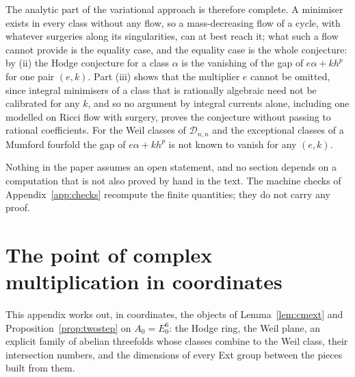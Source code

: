 \documentclass[11pt,reqno]{amsart}
\numberwithin{equation}{section}
\theoremstyle{plain}
\theoremstyle{definition}
\newcommand{\cD}{\mathcal{D}}
\begin{document}
The analytic part of the variational approach is therefore complete. A minimiser exists in every class without any flow, so a mass-decreasing flow of a cycle, with whatever surgeries along its singularities, can at best reach it; what such a flow cannot provide is the equality case, and the equality case is the whole conjecture: by (ii) the Hodge conjecture for a class $\alpha$ is the vanishing of the gap of $e\alpha+kh^{p}$ for one pair $(e,k)$. Part (iii) shows that the multiplier $e$ cannot be omitted, since integral minimisers of a class that is rationally algebraic need not be calibrated for any $k$, and so no argument by integral currents alone, including one modelled on Ricci flow with surgery, proves the conjecture without passing to rational coefficients. For the Weil classes of $\cD_{n,n}$ and the exceptional classes of a Mumford fourfold the gap of $e\alpha+kh^{p}$ is not known to vanish for any $(e,k)$.

Nothing in the paper assumes an open statement, and no section depends on a computation that is not also proved by hand in the text. The machine checks of Appendix~\ref{app:checks} recompute the finite quantities; they do not carry any proof.


\appendix
\section{The point of complex multiplication in coordinates}\label{app:cmpoint}

This appendix works out, in coordinates, the objects of Lemma~\ref{lem:cmext} and Proposition~\ref{prop:twostep} on $A_{0}=E_{0}^{6}$: the Hodge ring, the Weil plane, an explicit family of abelian threefolds whose classes combine to the Weil class, their intersection numbers, and the dimensions of every Ext group between the pieces built from them.
\end{document}
